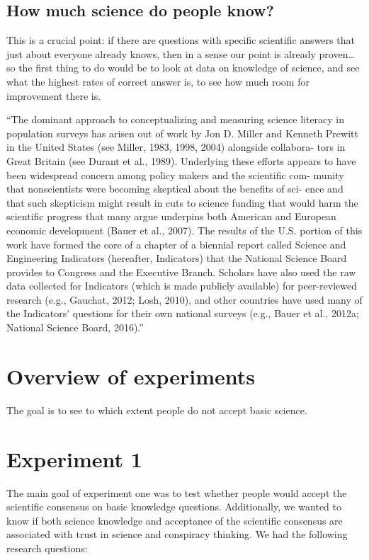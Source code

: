 \documentclass[
  doc,floatsintext]{apa6}
\begin{document}
\subsection{How much science do people know?}\label{how-much-science-do-people-know}

This is a crucial point: if there are questions with specific scientific answers that just about everyone already knows, then in a sense our point is already proven\ldots{} so the first thing to do would be to look at data on knowledge of science, and see what the highest rates of correct answer is, to see how much room for improvement there is.

``The dominant approach to conceptualizing and measuring science literacy in population surveys has arisen out of work by Jon D. Miller and Kenneth Prewitt in the United States (see Miller, 1983, 1998, 2004) alongside collabora- tors in Great Britain (see Durant et al., 1989). Underlying these efforts appears to have been widespread concern among policy makers and the scientific com- munity that nonscientists were becoming skeptical about the benefits of sci- ence and that such skepticism might result in cuts to science funding that would harm the scientific progress that many argue underpins both American and European economic development (Bauer et al., 2007). The results of the U.S. portion of this work have formed the core of a chapter of a biennial report called Science and Engineering Indicators (hereafter, Indicators) that the National Science Board provides to Congress and the Executive Branch. Scholars have also used the raw data collected for Indicators (which is made publicly available) for peer-reviewed research (e.g., Gauchat, 2012; Losh, 2010), and other countries have used many of the Indicators' questions for their own national surveys (e.g., Bauer et al., 2012a; National Science Board, 2016).''

\section{Overview of experiments}\label{overview-of-experiments}

The goal is to see to which extent people do not accept basic science.

\section{Experiment 1}\label{experiment-1}

The main goal of experiment one was to test whether people would accept the scientific consensus on basic knowledge questions. Additionally, we wanted to know if both science knowledge and acceptance of the scientific consensus are associated with trust in science and conspiracy thinking. We had the following research questions:
\end{document}
